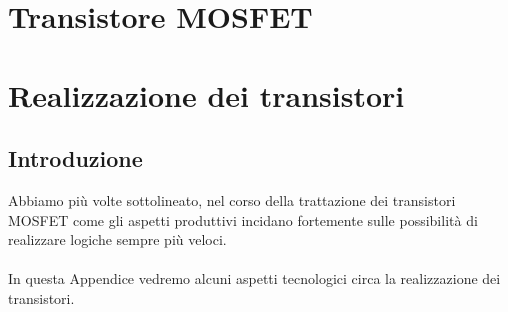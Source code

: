 \documentclass{article}
\numberwithin{equation}{subsection}
\begin{document}
	\section{Transistore MOSFET}
	
	
	\section{Realizzazione dei transistori}
	\subsection{Introduzione}
	Abbiamo più volte sottolineato, nel corso della trattazione dei transistori MOSFET come gli aspetti produttivi incidano fortemente sulle possibilità di realizzare logiche sempre più veloci.\\\\
	In questa Appendice vedremo alcuni aspetti tecnologici circa la realizzazione dei transistori.
\end{document}
